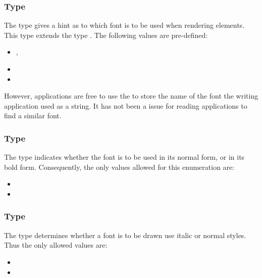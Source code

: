 \subsubsection{Type \fixttspace{}}

The \FontFamily type gives a hint as to which font is to be used when
rendering \Text elements. This type extends the type . The following values are pre-defined: 

\begin{itemize}
 \item {},
 \item {}
 \item {}
\end{itemize}

However, applications are free to use the \FontFamily to store the name of the font the writing application used as a string. It has not been a issue for reading applications to find a similar font. 

\subsubsection{Type \fixttspace{}}
The type \FontWeight indicates whether the font is to be used in its normal form, or in its bold form. Consequently, the only values allowed for this enumeration are: 

\begin{itemize}
 \item {} 
 \item {} 
\end{itemize}

\subsubsection{Type \fixttspace{}}

The type \FontStyle determines whether a font is to be
drawn use italic or normal styles. Thus the only allowed values are:

\begin{itemize}
 \item {} 
 \item {} 
\end{itemize}

